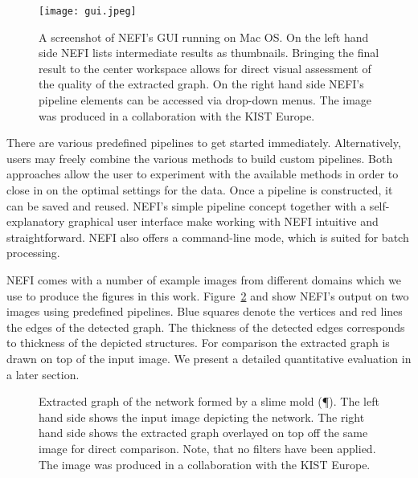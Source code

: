 	\begin{figure}
		\centering
		\texttt{[image: gui.jpeg]}
		\caption[NEFI's graphical user interface.]{A screenshot of NEFI's GUI running on Mac OS. On the left hand side NEFI lists intermediate results as thumbnails. Bringing the final result to the center workspace allows for direct visual assessment of the quality of the extracted graph. On the right hand side NEFI's pipeline elements can be accessed via drop-down menus. The image was produced in a collaboration with the KIST Europe.}
		\label{fig:nefi_gui}
	\end{figure}

	There are various predefined pipelines to get started immediately. Alternatively, users may freely combine the various methods to build custom pipelines. 
	Both approaches allow the user to experiment with the available methods in order to close in on the optimal settings for the data. Once a pipeline is constructed, it can be saved and reused. NEFI's simple pipeline concept together with a self-explanatory graphical user interface make working with NEFI intuitive and straightforward. NEFI also offers a command-line mode, which is suited for batch processing. 

	NEFI comes with a number of example images from different domains which we use to produce the figures in this work. Figure~\ref{fig:physarum} and  show NEFI's output on two images using predefined pipelines. Blue squares denote the vertices and red lines the edges of the detected graph. The thickness of the detected edges corresponds to thickness of the depicted structures. For comparison the extracted graph is drawn on top of the input image. We present a detailed quantitative evaluation in a later section.


	\begin{figure}
		\centering
		\caption[]{Extracted graph of the network formed by a slime mold (\P). The left hand side shows the input image depicting the network. The right hand side shows the extracted graph overlayed on top off the same image for direct comparison. Note, that no filters have been applied. The image was produced in a collaboration with the KIST Europe.}
		\label{fig:physarum}
	\end{figure}

